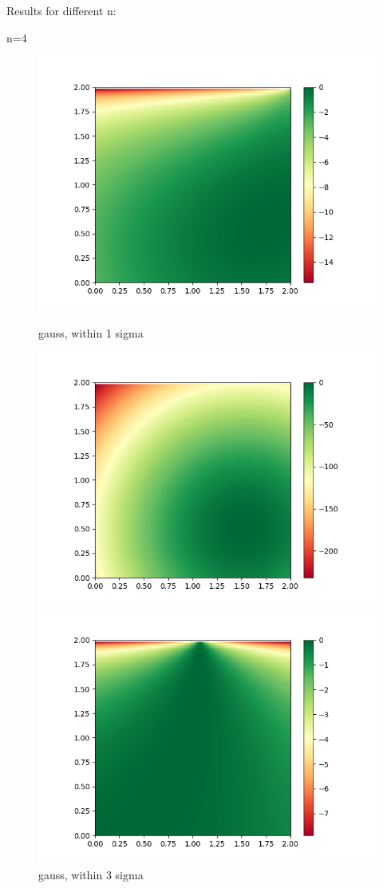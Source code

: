 \documentclass[english]{scrartcl}
\begin{document}
\par Results for different n:
\par n=4
\begin{figure}[H]
	\includegraphics[width=\linewidth]{lighthouse/2d/gauss_1sigma_n=4}
	\caption{gauss, within 1 sigma}  
	\endminipage \hfill
	\includegraphics[width=\linewidth]{lighthouse/2d/gauss_3sigma_n=4}
	\caption{gauss, within 3 sigma} 
	\endminipage \hfill
	\includegraphics[width=\linewidth]{lighthouse/2d/unif_n=4}

\end{figure}
\end{document}
